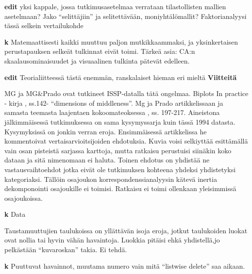 \documentclass[
  finnish,
]{book}
\begin{document}
\textbf{edit} yksi kappale, jossa tutkimusasetelmaa verrataan tilastollisten mallien
asetelmaan? Jako ``selittäjiin'' ja selitettävään, moniyhtälömallit?
Faktorianalyysi tässä selkein vertailukohde

\textbf{k} Matemaattisesti kaikki muuttuu paljon mutkikkaammaksi, ja yksinkertaisen
perustapauksen selkeät tulkinnat eivät toimi. Tärkeä asia: CA:n skaalausominaisuudet ja
visuaalinen tulkinta pätevät edelleen.

\textbf{edit} Teorialiitteessä tästä enemmän, ranskalaiset hieman eri mieltä
\textbf{Viitteitä}

MG ja MG\&Prado ovat tutkineet ISSP-datalla tätä ongelmaa.
Biplots In practice - kirja \citep{RefWorks:doc:5a857a43e4b0ed2d44664d7c}, ss.142-
``dimensions of middleness''. Mg ja Prado artikkelissaan
\citep{RefWorks:doc:5a857a44e4b0ed2d44664d87} ja samasta teemasta laajentaen
kokoomateoksessa \citep{RefWorks:doc:5ab76b43e4b003f4468d1f07}, ss. 197-217.
Aineistona jälkimmäisessä tutkimuksessa on sama kysymyssarja kuin tässä 1994
datasta. Kysymyksissä on jonkin verran eroja. Ensimmäisessä artikkelissa he kommentoivat vertaisarvioitsijoiden ehdotuksia. Kuvia voisi selkiyttää esittämällä vain osan
pisteistä sarjassa karttoja, mutta ratkaisu perustuisi siinäkin koko dataan ja
sitä nimenomaan ei haluta. Toinen ehdotus on yhdistää ne vastausvaihtoehdot jotka
eivät ole tutkimuksen kohteena yhdeksi yhdistetyksi kategoriaksi. Tällöin osajoukon
korrespondenssianalyysin kätevä inertia dekomponointi osajoukille ei toimisi. Ratkaisu
ei toimi ollenkaan yleisimmissä osajoukoissa.

\textbf{k} Data

Taustamuuttujien taulukoissa on yllättävän isoja eroja, jotkut taulukoiden luokat
ovat nollia tai hyvin vähän havaintoja. Luokkia pitäisi ehkä yhdistellä,jo pelkästään
``kuvaroskan'' takia. Ei tehdä.

\textbf{k} Puuttuvat havainnot, muutama numero vain mitä ``listwise delete'' saa aikaan.
\end{document}
